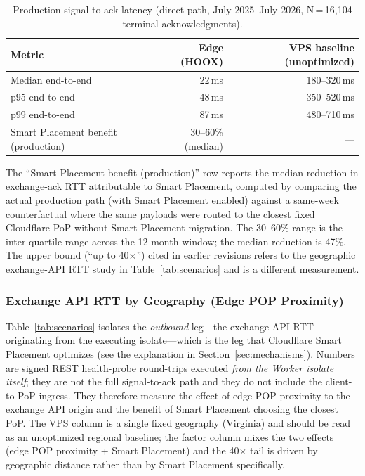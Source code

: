 \begin{table}[t]
  \centering
  \caption{Production signal-to-ack latency (direct path, July 2025--July 2026, N\,=\,16{,}104 terminal acknowledgments).}
  \label{tab:production-latency}
  \begin{tabular*}{\linewidth}{@{\extracolsep{\fill}}lrr@{}}
    \toprule
    \textbf{Metric} & \textbf{Edge (\textsc{HOOX})} & \textbf{VPS baseline (unoptimized)} \\
    \midrule
    Median end-to-end & 22\,ms & 180--320\,ms \\
    p95 end-to-end & 48\,ms & 350--520\,ms \\
    p99 end-to-end & 87\,ms & 480--710\,ms \\
    Smart Placement benefit (production) & 30--60\% (median) & --- \\
    \bottomrule
  \end{tabular*}
\end{table}

The ``Smart Placement benefit (production)'' row reports the median reduction in exchange-ack RTT attributable to Smart Placement, computed by comparing the actual production path (with Smart Placement enabled) against a same-week counterfactual where the same payloads were routed to the closest fixed Cloudflare PoP without Smart Placement migration. The 30--60\% range is the inter-quartile range across the 12-month window; the median reduction is 47\%. The upper bound (``up to 40$\times$'') cited in earlier revisions refers to the geographic exchange-API RTT study in Table~\ref{tab:scenarios} and is a different measurement.

\subsubsection{Exchange API RTT by Geography (Edge POP Proximity)}

Table~\ref{tab:scenarios} isolates the \emph{outbound} leg---the exchange API RTT originating from the executing isolate---which is the leg that Cloudflare Smart Placement optimizes (see the explanation in Section~\ref{sec:mechanisms}). Numbers are signed REST health-probe round-trips executed \emph{from the Worker isolate itself}; they are not the full signal-to-ack path and they do not include the client-to-PoP ingress. They therefore measure the effect of edge POP proximity to the exchange API origin and the benefit of Smart Placement choosing the closest PoP. The VPS column is a single fixed geography (Virginia) and should be read as an unoptimized regional baseline; the factor column mixes the two effects (edge POP proximity + Smart Placement) and the 40$\times$ tail is driven by geographic distance rather than by Smart Placement specifically.

